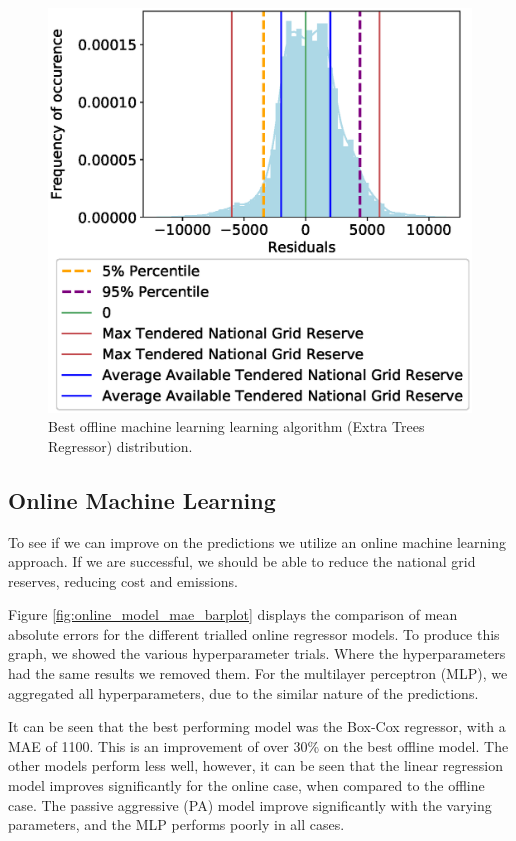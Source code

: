 \documentclass[final,3p,times,twocolumn,numbers]{elsarticle}
\begin{document}
\begin{figure}
\centering
\includegraphics[width=\columnwidth,natwidth=500,natheight=500]{figures/results/ExtraTreesRegressor_distribution_plot.eps}
\caption{Best offline machine learning learning algorithm (Extra Trees Regressor) distribution.}
\label{fig:best_offline_learning_day_distribution}
\end{figure}


\subsection{Online Machine Learning}

To see if we can improve on the predictions we utilize an online machine learning approach. If we are successful, we should be able to reduce the national grid reserves, reducing cost and emissions.

Figure \ref{fig:online_model_mae_barplot} displays the comparison of mean absolute errors for the different trialled online regressor models. To produce this graph, we showed the various hyperparameter trials. Where the hyperparameters had the same results we removed them. For the multilayer perceptron (MLP), we aggregated all hyperparameters, due to the similar nature of the predictions.

It can be seen that the best performing model was the Box-Cox regressor, with a MAE of 1100. This is an improvement of over 30\% on the best offline model. The other models perform less well, however, it can be seen that the linear regression model improves significantly for the online case, when compared to the offline case. The passive aggressive (PA) model improve significantly with the varying parameters, and the MLP performs poorly in all cases.
\end{document}
